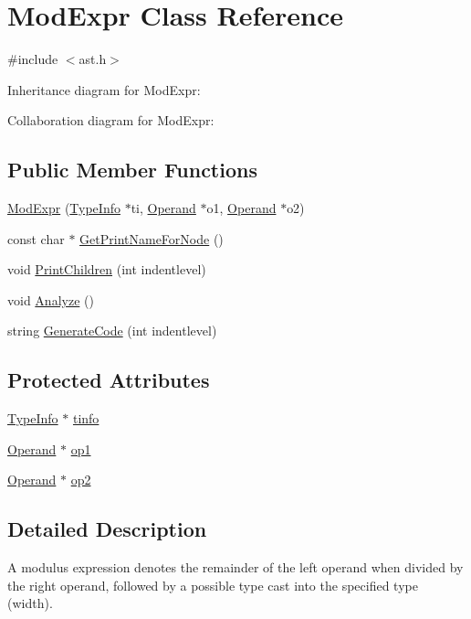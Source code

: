 \hypertarget{class_mod_expr}{}\section{Mod\+Expr Class Reference}
\label{class_mod_expr}


{\ttfamily \#include $<$ast.\+h$>$}



Inheritance diagram for Mod\+Expr\+:


Collaboration diagram for Mod\+Expr\+:
\subsection*{Public Member Functions}
\begin{DoxyCompactItemize}
\item 
\hyperlink{class_mod_expr_ab366df6eaae7636141460bfe6c83e905}{Mod\+Expr} (\hyperlink{class_type_info}{Type\+Info} $\ast$ti, \hyperlink{class_operand}{Operand} $\ast$o1, \hyperlink{class_operand}{Operand} $\ast$o2)
\item 
const char $\ast$ \hyperlink{class_mod_expr_a6e8f088ebc9429ae36cc6ae89c55588e}{Get\+Print\+Name\+For\+Node} ()
\item 
void \hyperlink{class_mod_expr_a63c59a077d8f2928ea05902533362e02}{Print\+Children} (int indentlevel)
\item 
void \hyperlink{class_mod_expr_aedcba31811fa2e4311c77a1989ca1d5c}{Analyze} ()
\item 
string \hyperlink{class_mod_expr_abb2f195af11f6f477b990e3d61e2dfb0}{Generate\+Code} (int indentlevel)
\end{DoxyCompactItemize}
\subsection*{Protected Attributes}
\begin{DoxyCompactItemize}
\item 
\hyperlink{class_type_info}{Type\+Info} $\ast$ \hyperlink{class_mod_expr_ae1372863ba85d1d2e1eb1e1e675d1ad4}{tinfo}
\item 
\hyperlink{class_operand}{Operand} $\ast$ \hyperlink{class_mod_expr_a46aa348a8321839cd2b29ea40fc3bb70}{op1}
\item 
\hyperlink{class_operand}{Operand} $\ast$ \hyperlink{class_mod_expr_a0d2a8a56e2fb1dd1506645aaaa2282cc}{op2}
\end{DoxyCompactItemize}


\subsection{Detailed Description}
A modulus expression denotes the remainder of the left operand when divided by the right operand, followed by a possible type cast into the specified type (width). 

